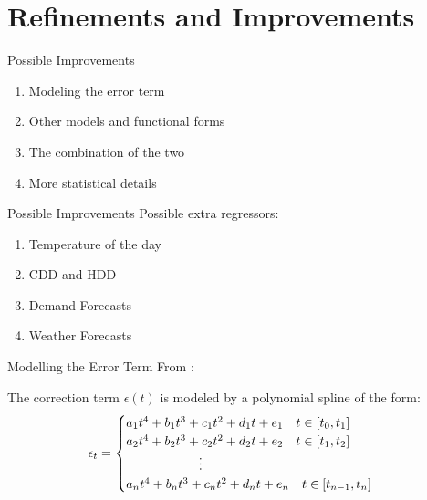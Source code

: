 \documentclass{beamer}
\begin{document}
\section{Refinements and Improvements}

\begin{frame}{Possible Improvements}
    \begin{enumerate}[label=\roman*.]
        \item Modeling the error term

        \item Other models and functional forms

        \item The combination of the two

        \item More statistical details
    \end{enumerate}
\end{frame}


\begin{frame}{Possible Improvements}
    Possible extra regressors:
    \begin{enumerate}[label=$\bullet$]
        \item Temperature of the day

        \item CDD and HDD

        \item Demand Forecasts

        \item Weather Forecasts
    \end{enumerate}
\end{frame}


\begin{frame}{Modelling the Error Term}
    From \cite{Saethero-2017}:

    The correction term $\epsilon(t)$ is modeled by a polynomial spline of the form:
    \[
        \epsilon_t
        = \begin{cases}
            a_1 t^4 + b_1 t^3 + c_1 t^2 + d_1 t + e_1 \quad t \in [t_0, t_1]
            \\
            a_2 t^4 + b_2 t^3 + c_2 t^2 + d_2 t + e_2 \quad t \in [t_1, t_2]
            \\
            \hspace*{2cm} \vdots
            \\
            a_n t^4 + b_n t^3 + c_n t^2 + d_n t + e_n \quad t \in [t_{n-1}, t_n]
            \\
        \end{cases}
    \]
\end{frame}
\end{document}
